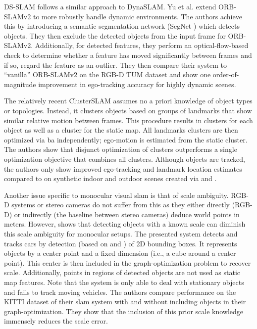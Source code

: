 \documentclass[headsepline, hidelinks, footsepline, footinclude=false, oneside, fontsize=11pt, paper=a4, listof=totoc, bibliography=totoc]{scrbook}
\begin{document}
DS-SLAM \cite{yuDSSLAMSemanticVisual2018} follows a similar approach to DynaSLAM. Yu et al. extend ORB-SLAMv2 \cite{mur-artalORBSLAM2OpenSourceSLAM2017} to more robustly handle dynamic environments.
The authors achieve this by introducing a semantic segmentation network (SegNet \cite{badrinarayananSegNetDeepConvolutional2017}) which detects objects. They then exclude the detected objects from the input frame for ORB-SLAMv2.
Additionally, for detected features, they perform an optical-flow-based check to determine whether a feature has moved significantly between frames and if so, regard the feature as an outlier.
They then compare their system to ``vanilla'' ORB-SLAMv2 on the RGB-D TUM dataset \cite{sturmBenchmarkEvaluationRGBD2012} and show one order-of-magnitude improvement in ego-tracking accuracy for highly dynamic scenes.

The relatively recent ClusterSLAM \cite{huangClusterSLAMSLAMBackend2019} assumes no a priori knowledge of object types or topologies. Instead, it clusters objects based on groups of landmarks that show similar relative motion
between frames. This procedure results in clusters for each object as well as a cluster for the static map. All landmarks clusters are then optimized via \gls{ba} independently; ego-motion is estimated from the static cluster.
The authors show that disjunct optimization of clusters outperforms a single optimization objective that combines all clusters. Although objects are tracked, the authors only show
improved ego-tracking and landmark location estimates compared to \cite{mur-artalORBSLAM2OpenSourceSLAM2017,bescosDynaSLAMTrackingMapping2018,reddyCarFusionCombiningPoint2018,muraliUtilizingSemanticVisual2018} 
on synthetic indoor and outdoor scenes created via \cite{songSemanticSceneCompletion2016} and \cite{dosovitskiyCARLAOpenUrban2017}. 

Another issue specific to monocular visual \gls{slam} is that of scale ambiguity. RGB-D systems or stereo cameras do not suffer from this as they either directly (RGB-D) or indirectly (the baseline between stereo cameras)
deduce world points in meters. However, \cite{frostRecoveringStableScale2018} shows that detecting objects with a known scale can diminish this scale ambiguity for monocular setups. 
The presented system detects and tracks cars by detection (based on \cite{zhangUnderstandingHighLevelSemantics2013} and \cite{geiger3DTrafficScene2014}) of 2D bounding boxes. 
It represents objects by a center point and a fixed dimension (i.e., a cube around a center point). This center is then included in the graph-optimization problem to recover scale. Additionally, points in regions of detected objects are not used as static map features. Note that the system is only able to deal with stationary objects and fails to track moving vehicles.
The authors compare performance on the KITTI dataset \cite{geigerVisionMeetsRobotics2013} of their \gls{slam} system with and without including objects in their graph-optimization.
They show that the inclusion of this prior scale knowledge immensely reduces the scale error.
\end{document}
